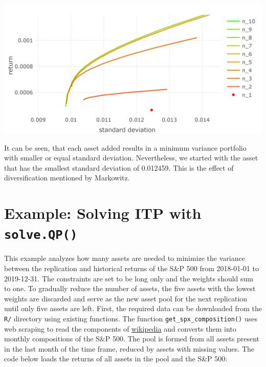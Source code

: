 \documentclass[
  oneside]{book}
\begin{document}
\includegraphics{Master_Thesis_files/figure-latex/qp_mvp4-1.png}

It can be seen, that each asset added results in a minimum variance portfolio with smaller or equal standard deviation. Nevertheless, we started with the asset that has the smallest standard deviation of 0.012459. This is the effect of diversification mentioned by Markowitz.

\hypertarget{exampleitpsolveqp}{%
\section{\texorpdfstring{Example: Solving ITP with \texttt{solve.QP()}}{Example: Solving ITP with solve.QP()}}\label{exampleitpsolveqp}}

This example analyzes how many assets are needed to minimize the variance between the replication and historical returns of the S\&P 500 from 2018-01-01 to 2019-12-31. The constraints are set to be long only and the weights should sum to one. To gradually reduce the number of assets, the five assets with the lowest weights are discarded and serve as the new asset pool for the next replication until only five assets are left. First, the required data can be downloaded from the \texttt{R/} directory using existing functions. The function \texttt{get\_spx\_composition()} uses web scraping to read the components of \href{https://en.wikipedia.org/wiki/List_of_S\%26P_500_companies}{wikipedia} and converts them into monthly compositions of the S\&P 500. The pool is formed from all assets present in the last month of the time frame, reduced by assets with missing values. The code below loads the returns of all assets in the pool and the S\&P 500:
\end{document}

